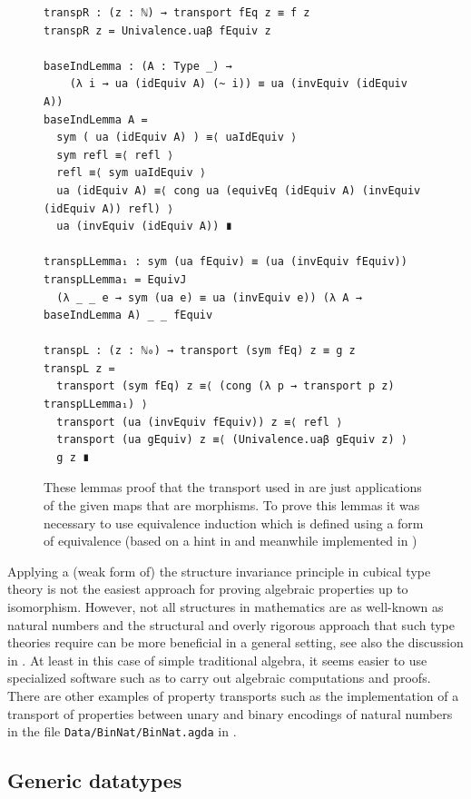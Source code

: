 \documentclass[12pt,a4paper,twoside,xetex]{book} %
\begin{document}
\begin{figure}\label{leftrighttransp}
 \begin{center}
  \begin{BVerbatim}
transpR : (z : ℕ) → transport fEq z ≡ f z
transpR z = Univalence.uaβ fEquiv z

baseIndLemma : (A : Type _) → 
    (λ i → ua (idEquiv A) (~ i)) ≡ ua (invEquiv (idEquiv A))
baseIndLemma A = 
  sym ( ua (idEquiv A) ) ≡⟨ uaIdEquiv ⟩
  sym refl ≡⟨ refl ⟩
  refl ≡⟨ sym uaIdEquiv ⟩
  ua (idEquiv A) ≡⟨ cong ua (equivEq (idEquiv A) (invEquiv (idEquiv A)) refl) ⟩
  ua (invEquiv (idEquiv A)) ∎

transpLLemma₁ : sym (ua fEquiv) ≡ (ua (invEquiv fEquiv))
transpLLemma₁ = EquivJ
  (λ _ _ e → sym (ua e) ≡ ua (invEquiv e)) (λ A → baseIndLemma A) _ _ fEquiv 

transpL : (z : ℕ₀) → transport (sym fEq) z ≡ g z
transpL z =
  transport (sym fEq) z ≡⟨ (cong (λ p → transport p z) transpLLemma₁) ⟩
  transport (ua (invEquiv fEquiv)) z ≡⟨ refl ⟩
  transport (ua gEquiv) z ≡⟨ (Univalence.uaβ gEquiv z) ⟩
  g z ∎
  \end{BVerbatim}

 \end{center}
\caption{These lemmas proof that the transport used in  are just applications of the given maps that are morphisms. To prove this lemmas it was necessary to use equivalence induction which is defined using a form of equivalence (based on a hint in \cite{Vez19} and meanwhile implemented in \cite{Moertberg2018})}
\end{figure}


Applying a (weak form of) the structure invariance principle in cubical type theory is not the easiest approach for proving algebraic properties up to isomorphism. However, not all structures in mathematics are as well-known as natural numbers and the structural and overly 
rigorous approach that such type theories require can be more beneficial in a 
general setting, see also the discussion in .  At least in this case of simple traditional algebra, it seems 
easier to use specialized software such as \cite{TheGAPGroup2018} to carry out 
algebraic computations and proofs. There are other examples of property transports such as the implementation of a transport of properties between unary and binary encodings of natural numbers in the file \texttt{Data/BinNat/BinNat.agda} in \cite{Moertberg2018}.


\subsection{Generic datatypes}
\end{document}
